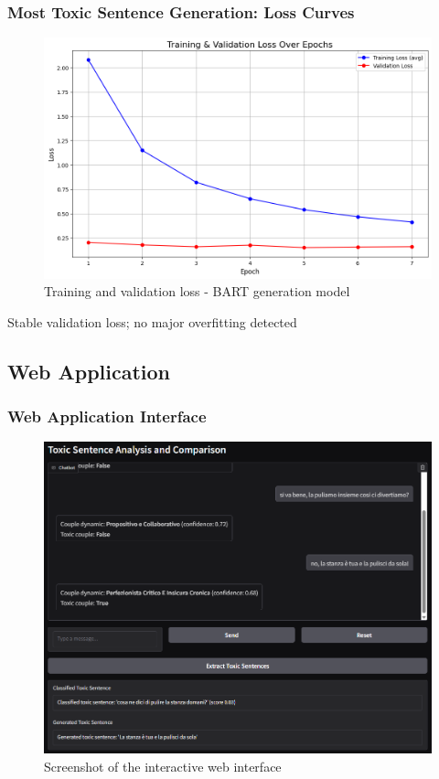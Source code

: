 \documentclass{beamer}
\begin{document}
\begin{frame}
\frametitle{Most Toxic Sentence Generation: Loss Curves}

\begin{figure}
\centering
\includegraphics[width=0.7\linewidth]{figures/bart_toxic_loss_curves.png}
\caption{Training and validation loss - BART generation model}
\end{figure}

\vspace{0.2cm}
\begin{center}
\colorbox{yellow!10}{\parbox{0.75\linewidth}{\centering Stable validation loss; no major overfitting detected}}
\end{center}

\end{frame}

\subsection{Web Application}

\begin{frame}
\frametitle{Web Application Interface}

\begin{figure}
\centering
\includegraphics[width=0.75\linewidth]{figures/web_app_interface_used.png}
\caption{Screenshot of the interactive web interface}
\end{figure}

\end{frame}
\end{document}
